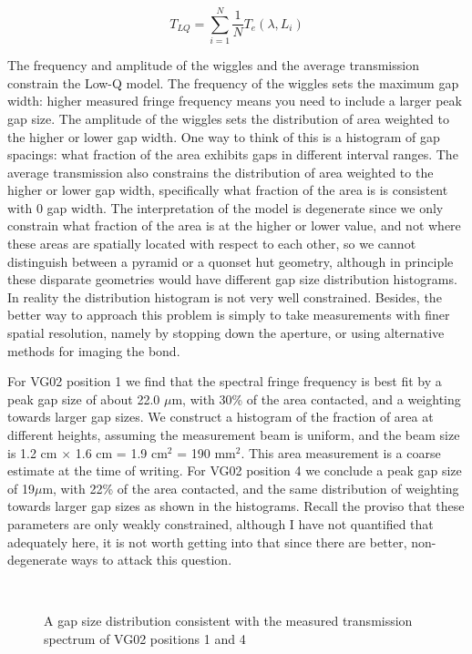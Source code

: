 $$T_{LQ}= \sum_{i=1}^N \frac{1}{N}T_e(\lambda,L_i)$$

The frequency and amplitude of the wiggles and the average transmission constrain the Low-Q model.  The frequency of the wiggles sets the maximum gap width: higher measured fringe frequency means you need to include a larger peak gap size.  The amplitude of the wiggles sets the distribution of area weighted to the higher or lower gap width.  One way to think of this is a histogram of gap spacings: what fraction of the area exhibits gaps in different interval ranges.  The average transmission also constrains the distribution of area weighted to the higher or lower gap width, specifically what fraction of the area is is consistent with 0 gap width.  The interpretation of the model is degenerate since we only constrain what fraction of the area is at the higher or lower value, and not where these areas are spatially located with respect to each other, so we cannot distinguish between a pyramid or a quonset hut geometry, although in principle these disparate geometries would have different gap size distribution histograms.  In reality the distribution histogram is not very well constrained.  Besides, the better way to approach this problem is simply to take measurements with finer spatial resolution, namely by stopping down the aperture, or using alternative methods for imaging the bond.  

For VG02 position 1 we find that the spectral fringe frequency is best fit by a peak gap size of about 22.0 $\mu$m, with 30\% of the area contacted, and a weighting towards larger gap sizes.  We construct a histogram of the fraction of area at different heights, assuming the measurement beam is uniform, and the beam size is 1.2 cm $\times$ 1.6 cm = 1.9 cm$^2$ = 190 mm$^2$.  This area measurement is a coarse estimate at the time of writing.  For VG02 position 4 we conclude a peak gap size of 19$\mu$m, with 22\% of the area contacted, and the same distribution of weighting towards larger gap sizes as shown in the histograms.  Recall the proviso that these parameters are only weakly constrained, although I have not quantified that adequately here, it is not worth getting into that since there are better, non-degenerate ways to attack this question.  


\begin{figure}[h!] 
\begin{center}
\ 
\ 
\caption[VG02 gap size distribution]{A gap size distribution consistent with the measured transmission spectrum of VG02 positions 1 and 4}
\label{fig:VG02gapDist}
\end{center}
\end{figure}

